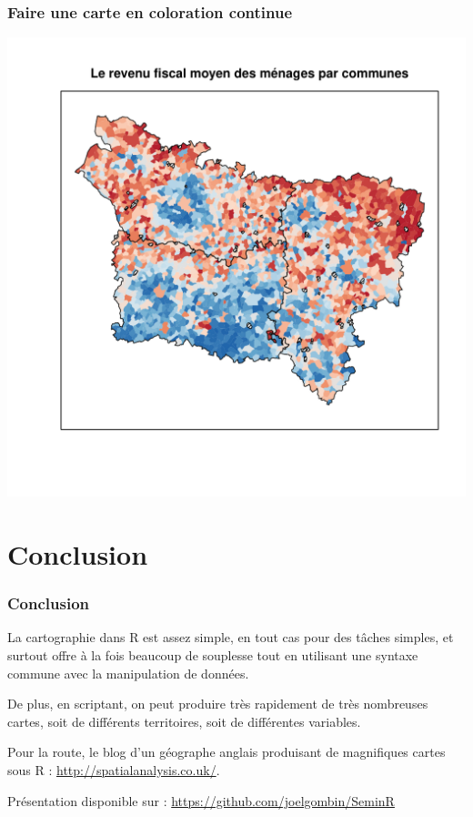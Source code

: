 \documentclass[slidetop, 10pt]{beamer}\usepackage{graphicx, color}
\newenvironment{knitrout}{}{} %
\renewenvironment{knitrout}{\begin{tiny}}{\end{tiny}}
\begin{document}
\begin{frame}
\frametitle{Faire une carte en coloration continue}
\begin{knitrout}\tiny
{}\color{fgcolor}

{\centering \includegraphics[width=.8\textwidth]{images/coloration} 

}


\end{knitrout}


\end{frame}
\section*{Conclusion}
\begin{frame}
\frametitle{Conclusion}

La cartographie dans R est assez simple, en tout cas pour des tâches simples, et surtout offre à la fois beaucoup de souplesse tout en utilisant une syntaxe commune avec la manipulation de données. 

De plus, en scriptant, on peut produire très rapidement de très nombreuses cartes, soit de différents territoires, soit de différentes variables.


Pour la route, le blog d'un géographe anglais produisant de magnifiques cartes sous R : \url{http://spatialanalysis.co.uk/}.

Présentation disponible sur : \url{https://github.com/joelgombin/SeminR}

\end{frame}
\end{document}

